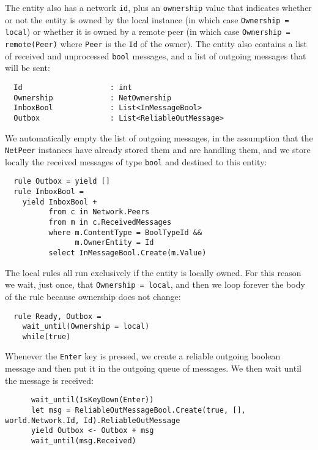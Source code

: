 The entity also has a network \texttt{id}, plus an \texttt{ownership} value that indicates whether or not the entity is owned by the local instance (in which case \texttt{Ownership = local}) or whether it is owned by a remote peer (in which case \texttt{Ownership = remote(Peer)} where \texttt{Peer} is the \texttt{Id} of the owner). The entity also contains a list of received and unprocessed \texttt{bool} messages, and a list of outgoing messages that will be sent:

\begin{lstlisting}
  Id                    : int
  Ownership             : NetOwnership
  InboxBool             : List<InMessageBool>
  Outbox                : List<ReliableOutMessage>
\end{lstlisting}

We automatically empty the list of outgoing messages, in the assumption that the \texttt{NetPeer} instances have already stored them and are handling them, and we store locally the received messages of type \texttt{bool} and destined to this entity:

\begin{lstlisting}
  rule Outbox = yield []
  rule InboxBool = 
    yield InboxBool +
          from c in Network.Peers
          from m in c.ReceivedMessages
          where m.ContentType = BoolTypeId &&
                m.OwnerEntity = Id
          select InMessageBool.Create(m.Value)
\end{lstlisting}

The local rules all run exclusively if the entity is locally owned. For this reason we wait, just once, that \texttt{Ownership = local}, and then we loop forever the body of the rule because ownership does not change:

\begin{lstlisting}
  rule Ready, Outbox = 
    wait_until(Ownership = local)
    while(true)
\end{lstlisting}

Whenever the \texttt{Enter} key is pressed, we create a reliable outgoing boolean message and then put it in the outgoing queue of messages. We then wait until the message is received:

\begin{lstlisting}
      wait_until(IsKeyDown(Enter))
      let msg = ReliableOutMessageBool.Create(true, [], world.Network.Id, Id).ReliableOutMessage
      yield Outbox <- Outbox + msg
      wait_until(msg.Received)
\end{lstlisting}

